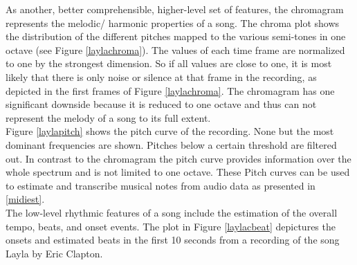 As another, better comprehensible, higher-level set of features, the chromagram represents the melodic/ harmonic properties of a song. The chroma plot shows the distribution of the different pitches mapped to the various semi-tones in one octave (see Figure \ref{laylachroma}). The values of each time frame are normalized to one by the strongest dimension. So if all values are close to one, it is most likely that there is only noise or silence at that frame in the recording, as depicted in the first frames of Figure \ref{laylachroma}. The chromagram has one significant downside because it is reduced to one octave and thus can not represent the melody of a song to its full extent.\\
Figure \ref{laylapitch} shows the pitch curve of the recording. None but the most dominant frequencies are shown. Pitches below a certain threshold are filtered out. In contrast to the chromagram the pitch curve provides information over the whole spectrum and is not limited to one octave. These Pitch curves can be used to estimate and transcribe musical notes from audio data as presented in \ref{midiest}.\\
The low-level rhythmic features of a song include the estimation of the overall tempo, beats, and onset events. 
The plot in Figure \ref{laylacbeat} depictures the onsets and estimated beats in the first 10 seconds from a recording of the song Layla by Eric Clapton.
